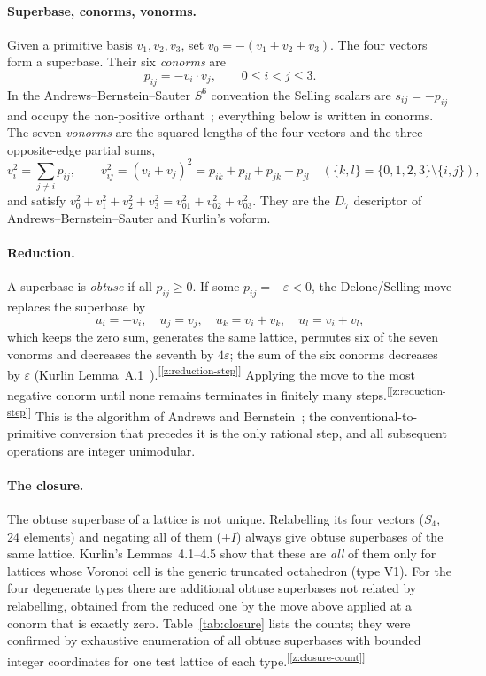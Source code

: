 \documentclass[11pt]{article}
\newcommand{\chk}[1]{\textsuperscript{[\ref{#1}]}}
\begin{document}
\paragraph{Superbase, conorms, vonorms.}
Given a primitive basis $v_1,v_2,v_3$, set $v_0=-(v_1+v_2+v_3)$. The four vectors form a superbase. Their six \emph{conorms} are
\[
p_{ij}=-v_i\cdot v_j,\qquad 0\le i<j\le3 .
\]
In the Andrews--Bernstein--Sauter $S^6$ convention the Selling scalars are $s_{ij}=-p_{ij}$ and occupy the non-positive orthant~\cite{abs2019}; everything below is written in conorms. The seven \emph{vonorms} are the squared lengths of the four vectors and the three opposite-edge partial sums,
\[
v_i^2=\sum_{j\ne i}p_{ij},\qquad v_{ij}^2=(v_i+v_j)^2=p_{ik}+p_{il}+p_{jk}+p_{jl}\quad(\{k,l\}=\{0,1,2,3\}\setminus\{i,j\}),
\]
and satisfy $v_0^2+v_1^2+v_2^2+v_3^2=v_{01}^2+v_{02}^2+v_{03}^2$. They are the $D_7$ descriptor of Andrews--Bernstein--Sauter and Kurlin's voform.

\paragraph{Reduction.}
A superbase is \emph{obtuse} if all $p_{ij}\ge0$. If some $p_{ij}=-\varepsilon<0$, the Delone/Selling move replaces the superbase by
\[
u_i=-v_i,\quad u_j=v_j,\quad u_k=v_i+v_k,\quad u_l=v_i+v_l,
\]
which keeps the zero sum, generates the same lattice, permutes six of the seven vonorms and decreases the seventh by $4\varepsilon$; the sum of the six conorms decreases by $\varepsilon$ (Kurlin Lemma~A.1~\cite{kurlin2026}).\chk{z:reduction-step} Applying the move to the most negative conorm until none remains terminates in finitely many steps.\chk{z:reduction-step} This is the algorithm of Andrews and Bernstein~\cite{ab1988,ab2014,abs2019}; the conventional-to-primitive conversion that precedes it is the only rational step, and all subsequent operations are integer unimodular.

\paragraph{The closure.}
The obtuse superbase of a lattice is not unique. Relabelling its four vectors ($S_4$, 24 elements) and negating all of them ($\pm I$) always give obtuse superbases of the same lattice. Kurlin's Lemmas~4.1--4.5 show that these are \emph{all} of them only for lattices whose Voronoi cell is the generic truncated octahedron (type V1). For the four degenerate types there are additional obtuse superbases not related by relabelling, obtained from the reduced one by the move above applied at a conorm that is exactly zero. Table~\ref{tab:closure} lists the counts; they were confirmed by exhaustive enumeration of all obtuse superbases with bounded integer coordinates for one test lattice of each type.\chk{z:closure-count}
\end{document}

